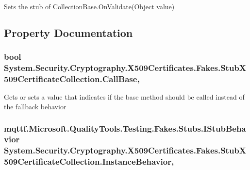 Sets the stub of Collection\-Base.\-On\-Validate(\-Object value)



\subsection{Property Documentation}
\hypertarget{class_system_1_1_security_1_1_cryptography_1_1_x509_certificates_1_1_fakes_1_1_stub_x509_certificate_collection_ad9063a236cf97171a35e15c93b04e174}{
\subsubsection[{Call\-Base}]{\setlength{\rightskip}{0pt plus 5cm}bool System.\-Security.\-Cryptography.\-X509\-Certificates.\-Fakes.\-Stub\-X509\-Certificate\-Collection.\-Call\-Base\hspace{0.3cm}{\ttfamily [get]}, {\ttfamily [set]}}}\label{class_system_1_1_security_1_1_cryptography_1_1_x509_certificates_1_1_fakes_1_1_stub_x509_certificate_collection_ad9063a236cf97171a35e15c93b04e174}


Gets or sets a value that indicates if the base method should be called instead of the fallback behavior

\hypertarget{class_system_1_1_security_1_1_cryptography_1_1_x509_certificates_1_1_fakes_1_1_stub_x509_certificate_collection_a5500a2884b2c060d254bb068ae03c182}{
\subsubsection[{Instance\-Behavior}]{\setlength{\rightskip}{0pt plus 5cm}mqttf.\-Microsoft.\-Quality\-Tools.\-Testing.\-Fakes.\-Stubs.\-I\-Stub\-Behavior System.\-Security.\-Cryptography.\-X509\-Certificates.\-Fakes.\-Stub\-X509\-Certificate\-Collection.\-Instance\-Behavior\hspace{0.3cm}{\ttfamily [get]}, {\ttfamily [set]}}}\label{class_system_1_1_security_1_1_cryptography_1_1_x509_certificates_1_1_fakes_1_1_stub_x509_certificate_collection_a5500a2884b2c060d254bb068ae03c182}


